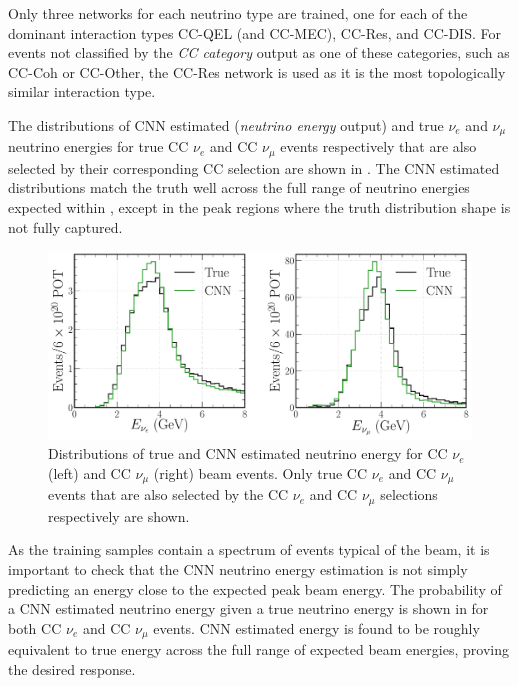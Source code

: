 Only three networks for each neutrino type are trained, one for each of the dominant interaction
types CC-QEL (and CC-MEC), CC-Res, and CC-DIS. For events not classified by the \emph{CC category}
output as one of these categories, such as CC-Coh or CC-Other, the CC-Res network is used as it is
the most topologically similar interaction type.

The distributions of CNN estimated (\emph{neutrino energy} output) and true $\nu_{e}$ and
$\nu_{\mu}$ neutrino energies for true CC $\nu_{e}$ and CC $\nu_{\mu}$ events respectively that
are also selected by their corresponding CC selection are shown in
. The CNN estimated distributions match the truth well across
the full range of neutrino energies expected within \chipsfive, except in the peak regions where
the truth distribution shape is not fully captured.

\begin{figure} %
    \includegraphics[width=\textwidth]{diagrams/7-results/final_energy_dists.pdf}
    \caption[Distributions of true and CNN estimated neutrino energy]
    {Distributions of true and CNN estimated neutrino energy for CC $\nu_{e}$ (left) and CC
        $\nu_{\mu}$ (right) beam events. Only true CC $\nu_{e}$ and CC $\nu_{\mu}$ events that are
        also selected by the CC $\nu_{e}$ and CC $\nu_{\mu}$ selections respectively are shown.}
    \label{fig:final_energy_dists}
\end{figure}

As the training samples contain a spectrum of events typical of the beam, it is important to check
that the CNN neutrino energy estimation is not simply predicting an energy close to the expected
peak beam energy. The probability of a CNN estimated neutrino energy given a true neutrino energy
is shown in  for both CC $\nu_{e}$ and CC $\nu_{\mu}$ events. CNN
estimated energy is found to be roughly equivalent to true energy across the full range of
expected \chipsfive beam energies, proving the desired response.

